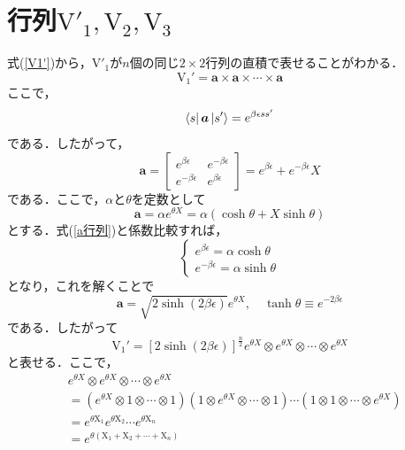 \documentclass[a4paper,11pt]{jsreport}
\begin{document}
\section{行列$\mathrm{V}'_1, \mathrm{V}_2, \mathrm{V}_3$}
式(\ref{V1'})から，$\mathrm{V}'_1$が$n$個の同じ$2 \times 2$行列の直積で表せることがわかる．
\begin{equation}
  \mathrm{V}_1'=\bm{a} \times \bm{a} \times \cdots \times \bm{a}
\end{equation}
ここで，
\begin{equation}
  \bra{s}\bm{a} \ket{s'}
  =e^{\beta \epsilon s s'}
\end{equation}
である．したがって，
\begin{equation}
  \bm{a}=\left[\begin{array}{cc}
      e^{\beta \epsilon}  & e^{-\beta \epsilon} \\
      e^{-\beta \epsilon} & e^{\beta \epsilon}
    \end{array}\right]=e^{\beta \epsilon}+e^{-\beta \epsilon} X
    \label{a行列}
\end{equation}
である．ここで，$\alpha$と$\theta$を定数として
\begin{equation}
  \bm{a} 
  = \alpha e^{\theta X}
  = \alpha (\cosh{\theta} + X \sinh{\theta})
\end{equation}
とする．式(\ref{a行列})と係数比較すれば，
\begin{equation}
  \begin{cases}
    e^{\beta \epsilon} = \alpha \cosh{\theta} \\
    e^{- \beta \epsilon} = \alpha \sinh{\theta}
  \end{cases}
\end{equation}
となり，これを解くことで
\begin{equation}
  \bm{a}
  =\sqrt{2 \sinh (2 \beta \epsilon)} e^{\theta X}, \quad
  \tanh \theta \equiv e^{-2 \beta \epsilon}
\end{equation}
である．したがって
\begin{equation}
  \mathrm{V}_1'=[2 \sinh (2 \beta \epsilon)]^{\frac{n}{2}} e^{\theta X} \otimes e^{\theta X} \otimes \cdots \otimes e^{\theta X}
\end{equation}
と表せる．ここで，
\begin{align}
  &e^{\theta X} \otimes e^{\theta X} \otimes \cdots \otimes e^{\theta X} \\
  &= (e^{\theta X} \otimes 1 \otimes \cdots \otimes 1) (1 \otimes e^{\theta X} \otimes \cdots \otimes 1) \cdots (1 \otimes 1 \otimes \cdots \otimes e^{\theta X}) \\
  &= e^{\theta \mathrm{X}_1} e^{\theta \mathrm{X}_2} \cdots e^{\theta \mathrm{X}_n} \\
  &= e^{\theta\left(\mathrm{X}_1+\mathrm{X}_2+\cdots+\mathrm{X}_n\right)}
\end{align}
\end{document}
